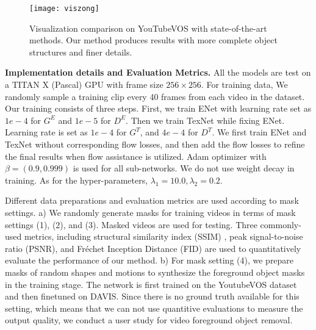 \begin{figure}[t]
	\centering
	\texttt{[image: viszong]} %
	\caption{Visualization comparison on YouTubeVOS with state-of-the-art methods. Our method produces results with more complete object structures and finer details.  }
	\label{viszong}
\end{figure}






\noindent \textbf{Implementation details and Evaluation Metrics.} 
All the models are test on a TITAN X (Pascal) GPU with frame size $256 \times 256$.
For training data, We randomly sample a training clip every 40 frames from each video in the dataset. Our training consists of three steps. First, we train ENet with learning rate set as $1e-4$ for $G^E$ and $1e-5$ for $D^E$. 
Then we train TexNet while fixing ENet. Learning rate is set as $1e-4$ for $G^T$, and $4e-4$ for $D^T$.
We first train ENet and TexNet without corresponding flow losses, and then add the flow losses to refine the final results when flow assistance is utilized.
Adam optimizer with $\beta=(0.9, 0.999)$ is used for all sub-networks.
We do not use weight decay in training.
As for the hyper-parameters, $\lambda_1=10.0,\lambda_2=0.2$.

Different data preparations and evaluation metrics are used according to mask settings. a) We randomly generate masks for training videos in terms of mask settings (1), (2), and (3). Masked videos are used for testing.
Three commonly-used metrics, including structural similarity index (SSIM) \cite{wang2004image}, peak signal-to-noise ratio (PSNR), and Fr{\'e}chet Inception Distance (FID) \cite{heusel2017gans} are used to quantitatively evaluate the performance of our method. 
b) For mask setting (4), we prepare masks of random shapes and motions to synthesize the foreground object masks in the training stage. The network is first trained on the YoutubeVOS dataset and then finetuned on DAVIS. Since there is no ground truth available for this setting, which means that we can not use quantitive evaluations to measure the output quality, we conduct a user study for video foreground object removal.  




